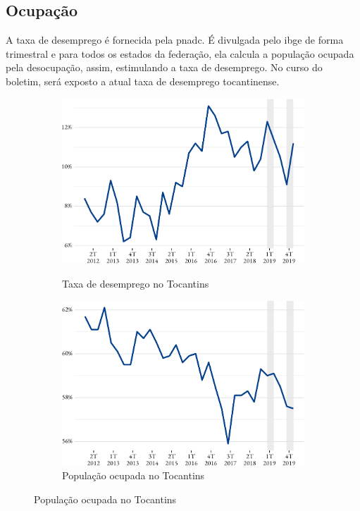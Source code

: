 \subsection{Ocupação}

\par A taxa de desemprego é fornecida pela \acrshort{pnadc}. É divulgada pelo \acrshort{ibge} de forma trimestral e para todos os estados da federação, ela calcula a população ocupada pela desocupação, assim, estimulando a taxa de desemprego. No curso do boletim, será exposto a atual taxa de desemprego tocantinense.

\begin{figure}[!h]
	\begin{subfigure}{\linewidth}
		\caption{Taxa de desemprego no Tocantins}
		\includegraphics{fig/tx_desemprego_to-1.pdf}
		\label{fig:desemprego}
	\end{subfigure}
	\begin{subfigure}{\linewidth}
		\caption{População ocupada no Tocantins}
		\includegraphics{fig/pop_ocupada-1.pdf}

\end{subfigure}
\end{figure}
